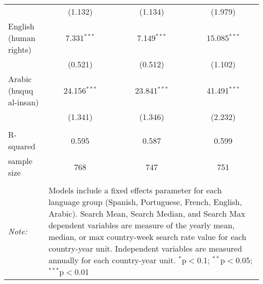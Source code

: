 \begin{table}[!htbp]
\begin{tabular}{@{\extracolsep{5pt}}lccc}
  & (1.132) & (1.134) & (1.979) \\ 
  English (human rights) & 7.331$^{***}$ & 7.149$^{***}$ & 15.085$^{***}$ \\ 
  & (0.521) & (0.512) & (1.102) \\ 
  Arabic (huquq al-insan) & 24.156$^{***}$ & 23.841$^{***}$ & 41.491$^{***}$ \\ 
  & (1.341) & (1.346) & (2.232) \\ 
 \hline \\[-1.8ex] 
R-squared  & 0.595 & 0.587 & 0.599 \\ 
sample size  & 768 & 747 & 751 \\ 
\hline 
\hline \\[-1.8ex] 
\textit{Note:}  & \multicolumn{3}{l}{\parbox[t]{8cm}{Models include a fixed effects parameter for each language group (Spanish, Portuguese, French, English, Arabic). Search Mean, Search Median, and Search Max dependent variables are measure of the yearly mean, median, or max country-week search rate value for each country-year unit. Independent variables are measured annually for each country-year unit. $^{*}$p$<$0.1; $^{**}$p$<$0.05; $^{***}$p$<$0.01}} \\ 
\end{tabular} 
\end{table} 
